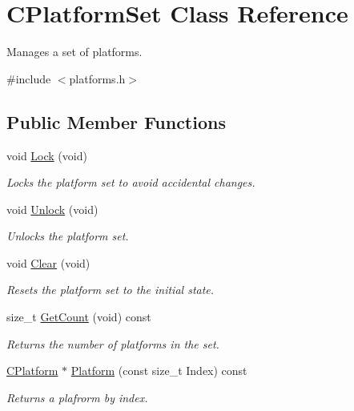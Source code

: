 \hypertarget{classCPlatformSet}{\section{C\-Platform\-Set Class Reference}
\label{classCPlatformSet}
}


Manages a set of platforms.  




{\ttfamily \#include $<$platforms.\-h$>$}

\subsection*{Public Member Functions}
\begin{DoxyCompactItemize}
\item 
void \hyperlink{classCPlatformSet_a575fcaf69b5e5fd9a37b5e54284b4e11}{Lock} (void)
\begin{DoxyCompactList}\small\item\em Locks the platform set to avoid accidental changes. \end{DoxyCompactList}\item 
void \hyperlink{classCPlatformSet_a1eb7afe6ee551c362982e871ed372df9}{Unlock} (void)
\begin{DoxyCompactList}\small\item\em Unlocks the platform set. \end{DoxyCompactList}\item 
void \hyperlink{classCPlatformSet_a41fc26c9d238b10cc2154b86d9a91127}{Clear} (void)
\begin{DoxyCompactList}\small\item\em Resets the platform set to the initial state. \end{DoxyCompactList}\item 
size\-\_\-t \hyperlink{classCPlatformSet_adf0879e4dba2d4f081e45a551e76464a}{Get\-Count} (void) const 
\begin{DoxyCompactList}\small\item\em Returns the number of platforms in the set. \end{DoxyCompactList}\item 
\hyperlink{classCPlatform}{C\-Platform} $\ast$ \hyperlink{classCPlatformSet_a876417c9ec7a5490587cdacac0ed1d2a}{Platform} (const size\-\_\-t Index) const 
\begin{DoxyCompactList}\small\item\em Returns a plafrorm by index. \end{DoxyCompactList}\item 

\end{DoxyCompactItemize}
